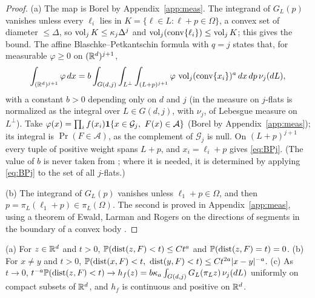 \documentclass[11pt]{article}
\begin{document}
\begin{proof}
(a) The map is Borel by Appendix~\ref{app:meas}. The integrand of $G_L(p)$ vanishes unless every $\ell_i$ lies in
$K=\{\ell\in L:\ell+p\in\Omega\}$, a convex set of diameter $\le\Delta$, so $\operatorname{vol}_jK\le\kappa_j\Delta^j$ and
$\operatorname{vol}_j(\operatorname{conv}\{\ell_i\})\le\operatorname{vol}_jK$; this gives the bound. The affine Blaschke--Petkantschin formula
\cite[Theorem~7.2.7]{SW} with $q=j$ states that, for measurable $\varphi\ge0$ on $(\mathbb{R}^d)^{j+1}$,
\[
  \int_{(\mathbb{R}^d)^{j+1}}\varphi\,dx=b\int_{G(d,j)}\int_{L^\perp}\int_{(L+p)^{j+1}}\varphi\,\operatorname{vol}_j(\operatorname{conv}\{x_i\})^a\,dx\,dp\,\nu_j(dL),
\]
with a constant $b>0$ depending only on $d$ and $j$ (in \cite{SW} the measure on $j$-flats is normalized as the integral over
$L\in G(d,j)$, with $\nu_j$, of Lebesgue measure on $L^\perp$). Take $\varphi(x)=\prod_if(x_i)\Cone\{x\in\mathcal G_j,\ F(x)\in\mathcal A\}$ (Borel by
Appendix~\ref{app:meas}); its integral is $\Pr(F\in\mathcal A)$, as the complement of $\mathcal G_j$ is null. On $(L+p)^{j+1}$ every
tuple of positive weight spans $L+p$, and $x_i=\ell_i+p$ gives \eqref{eq:BPj}. (The value of $b$ is never taken from
\cite{SW}; where it is needed, it is determined by applying \eqref{eq:BPj} to the set of all $j$-flats.)

(b) The integrand of $G_L(p)$ vanishes unless $\ell_1+p\in\Omega$, and then $p=\pi_L(\ell_1+p)\in\pi_L(\Omega)$. The second is proved in Appendix~\ref{app:meas}, using a theorem of Ewald,
Larman and Rogers on the directions of segments in the boundary of a convex body \cite{ELR}.
\end{proof}

\begin{lemma}\label{lem:ig}
(a) For $z\in\mathbb{R}^d$ and $t>0$, $\mathbb{P}(\operatorname{dist}(z,F)<t)\le Ct^a$ and $\mathbb{P}(\operatorname{dist}(z,F)=t)=0$.
(b) For $x\ne y$ and $t>0$, $\mathbb{P}(\operatorname{dist}(x,F)<t,\ \operatorname{dist}(y,F)<t)\le Ct^{2a}|x-y|^{-a}$.
(c) As $t\to0$, $t^{-a}\mathbb{P}(\operatorname{dist}(z,F)<t)\to h_f(z)=b\kappa_a\int_{G(d,j)}G_L(\pi_Lz)\,\nu_j(dL)$ uniformly on compact subsets of $\mathbb{R}^d$,
and $h_f$ is continuous and positive on $\mathbb{R}^d$.
\end{lemma}
\end{document}
